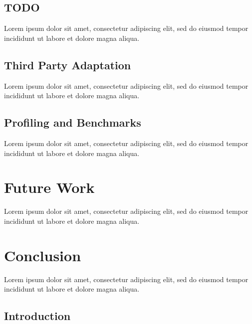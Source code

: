 \documentclass[12pt, a4paper]{article}
\begin{document}
\subsection{TODO}

Lorem ipsum dolor sit amet, consectetur adipiscing elit, sed do eiusmod tempor incididunt ut labore et dolore magna aliqua.


\subsection{Third Party Adaptation}

Lorem ipsum dolor sit amet, consectetur adipiscing elit, sed do eiusmod tempor incididunt ut labore et dolore magna aliqua.


\subsection{Profiling and Benchmarks}

Lorem ipsum dolor sit amet, consectetur adipiscing elit, sed do eiusmod tempor incididunt ut labore et dolore magna aliqua.


\section{Future Work}

Lorem ipsum dolor sit amet, consectetur adipiscing elit, sed do eiusmod tempor incididunt ut labore et dolore magna aliqua.


\section{Conclusion}

Lorem ipsum dolor sit amet, consectetur adipiscing elit, sed do eiusmod tempor incididunt ut labore et dolore magna aliqua.


\subsection{Introduction}
\end{document}
